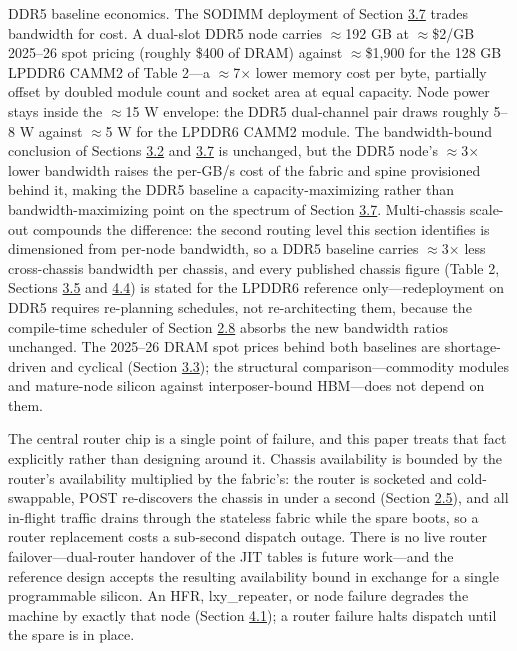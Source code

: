 \documentclass[12pt,onecolumn]{article}
\begin{document}
DDR5 baseline economics. The SODIMM deployment of Section \hyperref[sec:3.7]{3.7} trades bandwidth for cost. A dual-slot DDR5 node carries $\approx$192 GB at $\approx$\$2/GB 2025--26 spot pricing (roughly \$400 of DRAM) against $\approx$\$1,900 for the 128 GB LPDDR6 CAMM2 of Table 2---a $\approx$7$\times$ lower memory cost per byte, partially offset by doubled module count and socket area at equal capacity. Node power stays inside the $\approx$15 W envelope: the DDR5 dual-channel pair draws roughly 5--8 W against $\approx$5 W for the LPDDR6 CAMM2 module. The bandwidth-bound conclusion of Sections \hyperref[sec:3.2]{3.2} and \hyperref[sec:3.7]{3.7} is unchanged, but the DDR5 node's $\approx$3$\times$ lower bandwidth raises the per-GB/s cost of the fabric and spine provisioned behind it, making the DDR5 baseline a capacity-maximizing rather than bandwidth-maximizing point on the spectrum of Section \hyperref[sec:3.7]{3.7}. Multi-chassis scale-out compounds the difference: the second routing level this section identifies is dimensioned from per-node bandwidth, so a DDR5 baseline carries $\approx$3$\times$ less cross-chassis bandwidth per chassis, and every published chassis figure (Table 2, Sections \hyperref[sec:3.5]{3.5} and \hyperref[sec:4.4]{4.4}) is stated for the LPDDR6 reference only---redeployment on DDR5 requires re-planning schedules, not re-architecting them, because the compile-time scheduler of Section \hyperref[sec:2.8]{2.8} absorbs the new bandwidth ratios unchanged. The 2025--26 DRAM spot prices behind both baselines are shortage-driven and cyclical (Section \hyperref[sec:3.3]{3.3}); the structural comparison---commodity modules and mature-node silicon against interposer-bound HBM---does not depend on them.

The central router chip is a single point of failure, and this paper treats that fact explicitly rather than designing around it. Chassis availability is bounded by the router's availability multiplied by the fabric's: the router is socketed and cold-swappable, POST re-discovers the chassis in under a second (Section \hyperref[sec:2.5]{2.5}), and all in-flight traffic drains through the stateless fabric while the spare boots, so a router replacement costs a sub-second dispatch outage. There is no live router failover---dual-router handover of the JIT tables is future work---and the reference design accepts the resulting availability bound in exchange for a single programmable silicon. An HFR, lxy\_repeater, or node failure degrades the machine by exactly that node (Section \hyperref[sec:4.1]{4.1}); a router failure halts dispatch until the spare is in place.
\end{document}
